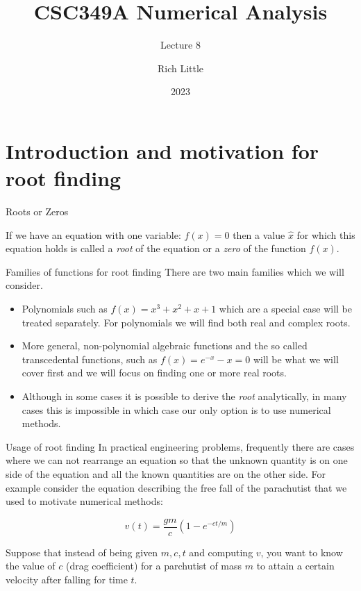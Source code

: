 \documentclass[12pt]{beamer}
\title[CSC349A Numerical Analysis]{CSC349A Numerical Analysis}
\subtitle[Lecture 8]{Lecture 8}
\date[2023]{2023}
\author[R. Little]{Rich Little}
\institute[University of Victoria]{University of Victoria}
\begin{document}
\frame{\maketitle} %




\section{Introduction and motivation for root finding} 

\begin{frame}{Roots or Zeros} 
\begin{definition} 
If we have an
equation with one variable: $f(x) = 0$ then a value $\hat x$ for
which this equation holds is called a {\it root} of the equation or
a {\it zero} of the function $f(x)$.
\end{definition} 
\end{frame} 

\begin{frame}{Families of functions for root finding}  
There are two main families which we will consider. 

\begin{itemize}
\item{Polynomials such as $f(x) = x^3 + x^2 +x + 1$ which are a special case will be treated
separately. For polynomials we will find both real and complex
roots.} 
\item{More general, non-polynomial algebraic functions and the so called transcedental functions, 
such as $f(x) = e^{-x} -x = 0$ will be what we will cover first and we will focus on
finding one or more real roots.} 
\item{Although in some cases it is possible
to derive the {\it root} analytically, in many cases this is
impossible in which case our only option is to use numerical methods.}
\end{itemize}
\end{frame} 

\begin{frame}{Usage of root finding} 
In practical engineering problems, frequently there are cases where we 
can not rearrange an equation so that the unknown quantity is on one
side of the equation and all the known quantities are on the other
side.  For example consider the equation describing the free fall of
the parachutist that we used to motivate numerical methods: 

\begin{equation} 
v(t) = \frac{gm}{c} (1-e^{-ct/m}) 
\end{equation}


\noindent 
Suppose that instead of being given $m,c,t$ and computing $v$, you
want to know the value of $c$ (drag coefficient) for a parchutist of
mass $m$ to attain a certain velocity after falling for time $t$. 
\end{frame}
\end{document}
